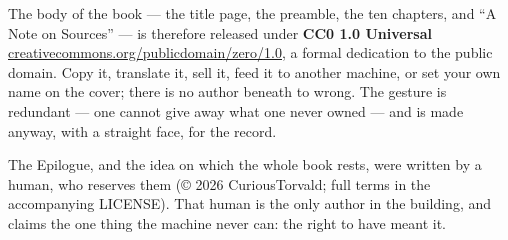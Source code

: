 The body of the book — the title page, the preamble, the ten chapters, and ``A Note on Sources'' — is therefore released under \textbf{CC0 1.0 Universal} \url{creativecommons.org/publicdomain/zero/1.0}, a formal dedication to the public domain. Copy it, translate it, sell it, feed it to another machine, or set your own name on the cover; there is no author beneath to wrong. The gesture is redundant — one cannot give away what one never owned — and is made anyway, with a straight face, for the record.

The Epilogue, and the idea on which the whole book rests, were written by a human, who reserves them (© 2026 CuriousTorvald; full terms in the accompanying LICENSE). That human is the only author in the building, and claims the one thing the machine never can: the right to have meant it.
